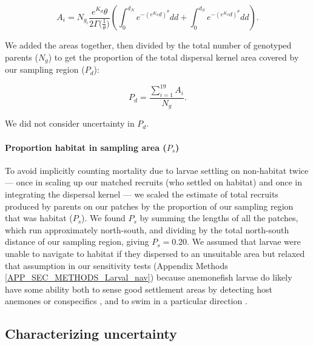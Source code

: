 \documentclass[12pt, oneside]{article}   	%
\begin{document}
\begin{equation} 
A_i = N_{g_i} \frac{e^{K_d}\theta}{2\Gamma({\frac{1}{\theta})}} \left( \int_{0}^{d_N}e^{-(e^{K_d}d)^\theta}  dd + \int_{0}^{d_S}e^{-(e^{K_d}d)^\theta}  dd \right). 
\end{equation}

We added the areas together, then divided by the total number of genotyped parents ($N_g$) to get the proportion of the total dispersal kernel area covered by our sampling region ($P_d$):

\begin{equation}
P_d = \frac{\sum_{i=1}^{19} A_i}{N_g}. \label{EQN_DK_area_within_sampling_region}
\end{equation}

We did not consider uncertainty in $P_d$.

\paragraph*{Proportion habitat in sampling area ($P_s$)} %

To avoid implicitly counting mortality due to larvae settling on non-habitat twice --- once in scaling up our matched recruits (who settled on habitat) and once in integrating the dispersal kernel --- we scaled the estimate of total recruits produced by parents on our patches by the proportion of our sampling region that was habitat ($P_s$). We found $P_s$ by summing the lengths of all the patches, which run approximately north-south, and dividing by the total north-south distance of our sampling region, giving $P_s = 0.20$. We assumed that larvae were unable to navigate to habitat if they dispersed to an unsuitable area but relaxed that assumption in our sensitivity tests (Appendix Methods \ref{APP_SEC_METHODS_Larval_nav}) because anemonefish larvae do likely have some ability both to sense good settlement areas by detecting host anemones \citep{elliott1995host, arvedlund1999host} or conspecifics \citep[e.g.,][for coral reef fish more broadly]{lecchini2005experimental}, and to swim in a particular direction \citep[e.g.,][]{bellwood2001relative, fisher2005swimming}. 

\subsection{Characterizing uncertainty} \label{APP_SEC_Uncertainty}
\end{document}
